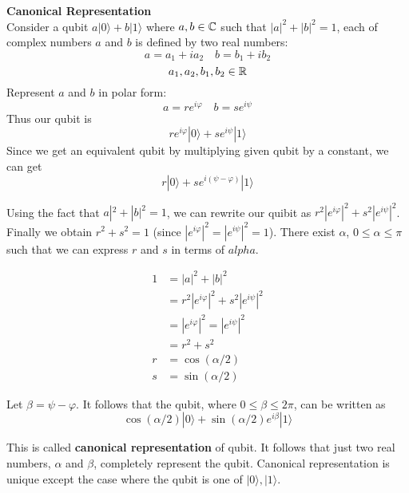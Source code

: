 \textbf{Canonical Representation}\\
Consider a qubit $a|0\rangle + b|1\rangle$ where $a,b \in \mathbb{C}$ such that $|a|^2 + |b|^2 = 1$,
each of complex numbers $a$ and $b$ is defined by two real numbers:
$$a = a_1 + ia_2 \quad b = b_1 +ib_2$$
$$a_1, a_2, b_1, b_2 \in \mathbb{R}$$
Represent $a$ and $b$ in polar form:
$$a = re^{i\varphi} \quad b = se^{i\psi}$$
Thus our qubit is
$$re^{i\varphi}|0\rangle + se^{i\psi}|1\rangle$$
Since we get an equivalent qubit by multiplying given qubit by a constant,
we can get
$$r|0\rangle + se^{i(\psi - \varphi)}|1\rangle$$

Using the fact that $a|^2 + |b|^2 = 1$,
we can rewrite our quibit as $r^2|e^{i\varphi}|^2 + s^2|e^{i\psi}|^2$.
Finally we obtain $r^2 + s^2 = 1$ (since $|e^{i\varphi}|^2 = |e^{i\psi}|^2 = 1$).
There exist $\alpha$, $0 \leq \alpha \leq \pi$ such that we can
express $r$ and $s$ in terms of $alpha$.

\begin{align*}
    1 &= |a|^2 + |b|^2 \\
      &= r^2|e^{i\varphi}|^2 + s^2|e^{i\psi}|^2 \\
      &= |e^{i\varphi}|^2 = |e^{i\psi}|^2 \\
      &= r^2 + s^2 \\
    r &= \cos(\alpha/2) \\
    s &= \sin(\alpha/2)
\end{align*}

Let $\beta = \psi − \varphi$. It follows that the qubit,
where $0 \leq \beta \leq 2\pi$,
can be written as
$$\cos(\alpha/2)|0\rangle + \sin(\alpha/2)e^{i\beta} |1\rangle$$

This is called \textbf{canonical representation} of qubit.
It follows that just two real numbers, $\alpha$ and $\beta$,
completely represent the qubit.
Canonical representation is unique except the case where the qubit is one of $|0\rangle, |1\rangle$.\\


